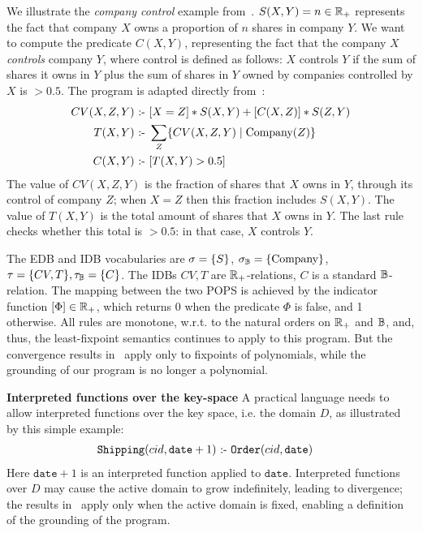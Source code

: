 \begin{ex} We illustrate the {\em company control} example
  from~\cite[Example 3.2]{DBLP:conf/pods/RossS92}.
  $S(X,Y)=n \in \mathbb R_+$ represents the fact that company $X$ owns a
  proportion of $n$ shares in company $Y$.  We want to compute the
  predicate $C(X,Y)$, representing the fact that the company $X$ {\em
    controls} company $Y$, where control is defined as follows: $X$
  controls $Y$ if the sum of shares it owns in $Y$ plus the sum of
  shares in $Y$ owned by companies controlled by $X$ is $>0.5$.  The
  program is adapted directly from~\cite{DBLP:conf/pods/RossS92}:
  \begin{align*}
    CV(X,Z,Y) \text{ :- } & [X=Z]*S(X,Y) + [C(X,Z)]*S(Z,Y) \\
    T(X,Y) \text{ :- } & \sum_Z \{{CV(X,Z,Y)}\mid{\text{Company}(Z)}\} \\
    C(X,Y) \text{ :- } & [T(X,Y) > 0.5]
  \end{align*}
  The value of $CV(X,Z,Y)$ is the fraction of shares that $X$ owns in
  $Y$, through its control of company $Z$; when $X=Z$ then this
  fraction includes $S(X,Y)$.  The value of $T(X,Y)$ is the total
  amount of shares that $X$ owns in $Y$.  The last rule checks whether
  this total is $>0.5$: in that case, $X$ controls $Y$.

  The EDB and IDB vocabularies are $\sigma = \{S\}$,
  $\sigma_\mathbb B = \{\text{Company}\}$,
  $\tau = \{CV, T\}, \tau_\mathbb B = \{C\}$.  The IDBs $CV, T$ are
  $\mathbb R_+$-relations, $C$ is a standard $\mathbb B$-relation.  The mapping
  between the two POPS is achieved by the indicator function
  $[\Phi] \in \mathbb R_+$, which returns 0 when the predicate $\Phi$ is
  false, and 1 otherwise.  All rules are monotone, w.r.t. to the
  natural orders on $\mathbb R_+$ and $\mathbb B$, and, thus, the least-fixpoint
  semantics continues to apply to this program. 
  But the convergence results in~\cite{DBLP:conf/pods/Khamis0PSW22}
   apply only to fixpoints of polynomials,
  while the grounding of our program is no longer a polynomial.
\end{ex}


{\bf Interpreted functions over the key-space} A practical language
needs to allow interpreted functions over the key space, i.e. the
domain $D$, as illustrated by this simple example:
\begin{align*}
  \texttt{Shipping}(cid,\texttt{date}+1) \text{ :- } & \texttt{Order}(cid,\texttt{date})
\end{align*}
Here $\texttt{date}+1$ is an interpreted function applied to
$\texttt{date}$.  Interpreted functions over $D$ may cause the active
domain to grow indefinitely, leading to divergence; the results in~\cite{DBLP:conf/pods/Khamis0PSW22} 
apply only when the active domain is fixed,
enabling a definition of the grounding of the
\datalogo program.

